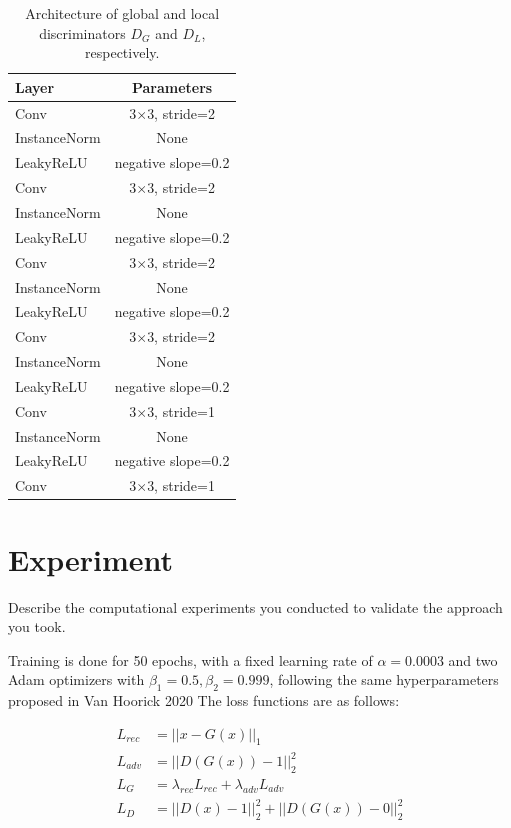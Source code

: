 \documentclass{article}
\begin{document}
\begin{table}[h] 
  \centering  
    \begin{tabular}{lc}  
    \hline
    \textbf{Layer} & \textbf{Parameters}\\ 
    \hline \hline
      Conv & 3$\times$3, stride=2 \\
    \hline
      InstanceNorm & None \\
    \hline
      LeakyReLU & negative slope=0.2 \\
    \hline
      Conv & 3$\times$3, stride=2 \\
    \hline
      InstanceNorm & None \\
    \hline
      LeakyReLU & negative slope=0.2 \\
    \hline
      Conv & 3$\times$3, stride=2 \\
    \hline
      InstanceNorm & None \\
    \hline
      LeakyReLU & negative slope=0.2 \\
    \hline
      Conv & 3$\times$3, stride=2 \\
    \hline
      InstanceNorm & None \\
    \hline
      LeakyReLU & negative slope=0.2 \\
    \hline
      Conv & 3$\times$3, stride=1 \\
    \hline
      InstanceNorm & None \\
    \hline
      LeakyReLU & negative slope=0.2 \\
    \hline
      Conv & 3$\times$3, stride=1 \\
    \hline
    \end{tabular}
  
  \caption{Architecture of global and local discriminators $D_G$ and $D_L$, respectively.} 
  \label{tab:3}
\end{table}

\section{Experiment}
Describe the computational experiments you conducted to validate the approach you took.

Training is done for 50 epochs, with a fixed learning rate of $\alpha=0.0003$ and two Adam optimizers with $\beta_1=0.5, \beta_2=0.999$, following the same hyperparameters proposed in Van Hoorick 2020 \cite{van_hoorick_image_2020} The loss functions are as follows:

\begin{align}
  L_{rec} &= ||x-G(x)||_1 \\
  L_{adv} &= ||D(G(x))-1||_2^2 \\
  L_G &= \lambda_{rec}L_{rec} + \lambda_{adv}L_{adv} \\
  L_D &= ||D(x)-1||_2^2 + ||D(G(x))-0||_2^2
\end{align}
\end{document}
